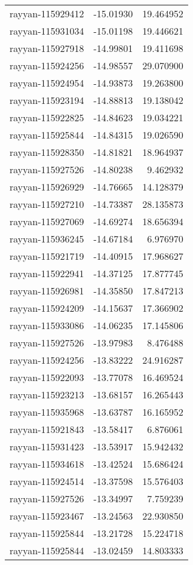 \documentclass[
]{article}
\begin{document}
\begin{longtable}[]{@{}lrr@{}}
rayyan-115929412 & -15.01930 & 19.464952 \\
rayyan-115931034 & -15.01198 & 19.446621 \\
rayyan-115927918 & -14.99801 & 19.411698 \\
rayyan-115924256 & -14.98557 & 29.070900 \\
rayyan-115924954 & -14.93873 & 19.263800 \\
rayyan-115923194 & -14.88813 & 19.138042 \\
rayyan-115922825 & -14.84623 & 19.034221 \\
rayyan-115925844 & -14.84315 & 19.026590 \\
rayyan-115928350 & -14.81821 & 18.964937 \\
rayyan-115927526 & -14.80238 & 9.462932 \\
rayyan-115926929 & -14.76665 & 14.128379 \\
rayyan-115927210 & -14.73387 & 28.135873 \\
rayyan-115927069 & -14.69274 & 18.656394 \\
rayyan-115936245 & -14.67184 & 6.976970 \\
rayyan-115921719 & -14.40915 & 17.968627 \\
rayyan-115922941 & -14.37125 & 17.877745 \\
rayyan-115926981 & -14.35850 & 17.847213 \\
rayyan-115924209 & -14.15637 & 17.366902 \\
rayyan-115933086 & -14.06235 & 17.145806 \\
rayyan-115927526 & -13.97983 & 8.476488 \\
rayyan-115924256 & -13.83222 & 24.916287 \\
rayyan-115922093 & -13.77078 & 16.469524 \\
rayyan-115923213 & -13.68157 & 16.265443 \\
rayyan-115935968 & -13.63787 & 16.165952 \\
rayyan-115921843 & -13.58417 & 6.876061 \\
rayyan-115931423 & -13.53917 & 15.942432 \\
rayyan-115934618 & -13.42524 & 15.686424 \\
rayyan-115924514 & -13.37598 & 15.576403 \\
rayyan-115927526 & -13.34997 & 7.759239 \\
rayyan-115923467 & -13.24563 & 22.930850 \\
rayyan-115925844 & -13.21728 & 15.224718 \\
rayyan-115925844 & -13.02459 & 14.803333 \\

\end{longtable}
\end{document}
